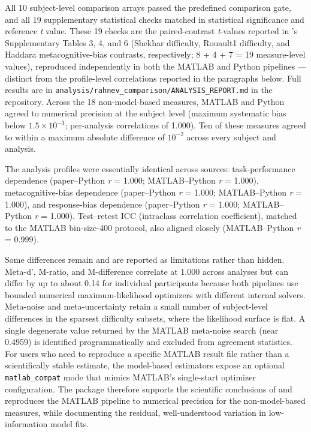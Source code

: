 \documentclass{article}
\begin{document}
All 10 subject-level comparison arrays passed the predefined comparison gate, and all 19 supplementary statistical checks matched in statistical significance and reference \emph{t} value. These 19 checks are the paired-contrast \emph{t}-values reported in \citet{rahnev2025}'s Supplementary Tables 3, 4, and 6 (Shekhar difficulty, Rouault1 difficulty, and Haddara metacognitive-bias contrasts, respectively; 8 + 4 + 7 = 19 measure-level values), reproduced independently in both the MATLAB and Python pipelines — distinct from the profile-level correlations reported in the paragraphs below. Full results are in \texttt{analysis/rahnev\_comparison/ANALYSIS\_REPORT.md} in the repository. Across the 18 non-model-based measures, MATLAB and Python agreed to numerical precision at the subject level (maximum systematic bias below $1.5 \times 10^{-3}$; per-analysis correlations of 1.000). Ten of these measures agreed to within a maximum absolute difference of $10^{-2}$ across every subject and analysis.

The analysis profiles were essentially identical across sources: task-performance dependence (paper--Python \emph{r} = 1.000; MATLAB--Python \emph{r} = 1.000), metacognitive-bias dependence (paper--Python \emph{r} = 1.000; MATLAB--Python \emph{r} = 1.000), and response-bias dependence (paper--Python \emph{r} = 1.000; MATLAB--Python \emph{r} = 1.000). Test--retest ICC (intraclass correlation coefficient), matched to the MATLAB bin-size-400 protocol, also aligned closely (MATLAB--Python \emph{r} = 0.999).

Some differences remain and are reported as limitations rather than hidden. Meta-d', M-ratio, and M-difference correlate at 1.000 across analyses but can differ by up to about 0.14 for individual participants because both pipelines use bounded numerical maximum-likelihood optimizers with different internal solvers. Meta-noise and meta-uncertainty retain a small number of subject-level differences in the sparsest difficulty subsets, where the likelihood surface is flat. A single degenerate value returned by the MATLAB meta-noise search (near 0.4959) is identified programmatically and excluded from agreement statistics. For users who need to reproduce a specific MATLAB result file rather than a scientifically stable estimate, the model-based estimators expose an optional \texttt{matlab\_compat} mode that mimics MATLAB's single-start optimizer configuration. The package therefore supports the scientific conclusions of \citet{rahnev2025} and reproduces the MATLAB pipeline to numerical precision for the non-model-based measures, while documenting the residual, well-understood variation in low-information model fits.
\end{document}
